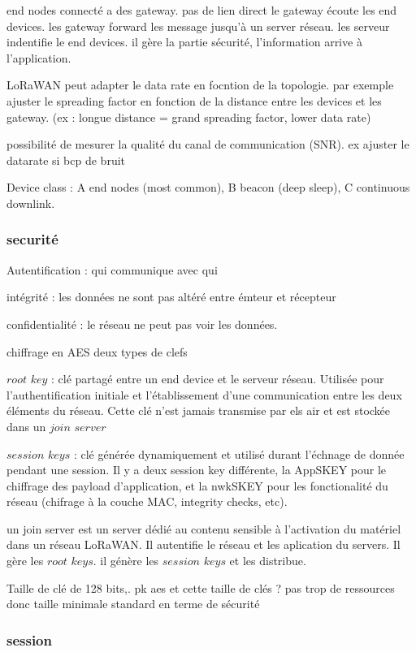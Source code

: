 \documentclass[12pt,a4paper,oneside, titlepage]{report}
\begin{document}
end nodes connecté a des gateway. pas de lien direct le gateway écoute les end devices. les gateway forward les message jusqu'à un server réseau. les serveur indentifie le end devices. il gère la partie sécurité, l'information arrive à l'application.

LoRaWAN peut adapter le data rate en focntion de la topologie. par exemple ajuster le spreading factor en fonction de la distance entre les devices et les gateway. (ex : longue distance = grand spreading factor, lower data rate)

possibilité de mesurer la qualité du canal de communication (SNR). ex ajuster le datarate si bcp de bruit

Device class :
A end nodes (most common), 
B beacon (deep sleep),
C continuous downlink.

\subsubsection{securité}

Autentification : qui communique avec qui

intégrité : les données ne sont pas altéré entre émteur et récepteur

confidentialité : le réseau ne peut pas voir les données.

chiffrage en AES
deux types de clefs

$root$ $key$ : clé partagé entre un end device et le serveur réseau. Utilisée pour l'authentification initiale et l'établissement d'une communication entre les deux éléments du réseau. Cette clé n'est jamais transmise par els air et est stockée dans un $join$ $server$

$session$ $keys$ : clé générée dynamiquement et utilisé durant l'échnage de donnée pendant une session. Il y a deux session key différente, la AppSKEY pour le chiffrage des payload d'application, et la nwkSKEY pour les fonctionalité du réseau (chifrage à la couche MAC, integrity checks, etc).

un join server est un server dédié au contenu sensible à l'activation du matériel dans un réseau LoRaWAN. Il autentifie le réseau et les aplication du servers. Il gère les $root$ $keys$. il génère les $session$ $keys$ et les distribue.

Taille de clé de 128 bits,.
pk aes et cette taille de clés ? pas trop de ressources donc taille minimale standard en terme de sécurité

\subsubsection{session}
\end{document}
